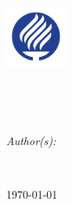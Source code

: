 \documentclass[
11pt, 
oneside,
english,
onehalfspacing,
onehalfspacing,
parskip,
headsepline,
chapterinoneline,
]{MastersDoctoralThesis}
\author{
Antonio Osamu \textsc{Katagiri} Tanaka;
\supname;
}
\begin{document}
\frontmatter

\pagestyle{plain} 


\begin{titlepage}
\begin{center}

\vspace*{.06\textheight}
{\scshape\LARGE \univname\par} %

\begin{center}
\includegraphics[width=0.15\textwidth]{./Figures/uniLogo.png}
\end{center}

\vfill

\HRule \\%
{\huge \bfseries \ttitle\par}\vspace{0.0cm} %
\HRule \\[0.5cm]                            %

\vfill
 
\begin{flushleft} \large
\emph{Author(s):}\\

\authorname
\end{flushleft}
 
\vfill

\groupname \\
\deptname
 
\vfill

{\addressname \text{, } \large \today}\\[4cm]
 
\vfill

\end{center}
\end{titlepage}
\end{document}
